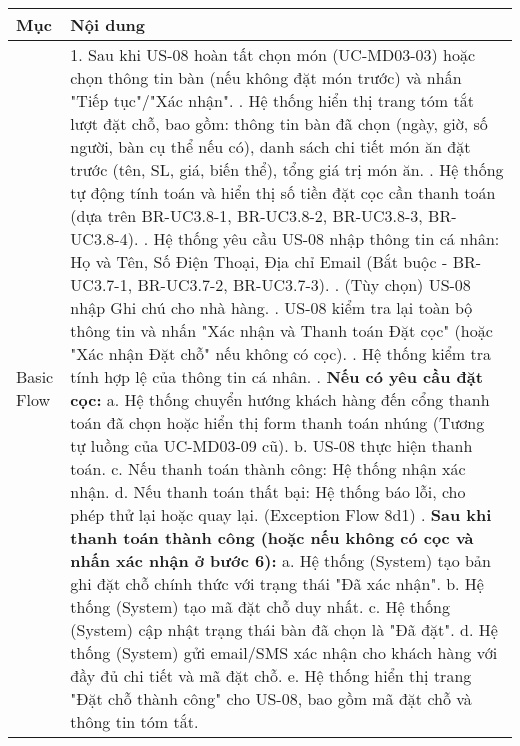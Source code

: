 \begin{longtable}{|m{4cm}|p{11cm}|}
\hline
\textbf{Mục} & \textbf{Nội dung} \\
\hline
Basic Flow & 1. Sau khi US-08 hoàn tất chọn món (UC-MD03-03) hoặc chọn thông tin bàn (nếu không đặt món trước) và nhấn "Tiếp tục"/"Xác nhận". \newline 2. Hệ thống hiển thị trang tóm tắt lượt đặt chỗ, bao gồm: thông tin bàn đã chọn (ngày, giờ, số người, bàn cụ thể nếu có), danh sách chi tiết món ăn đặt trước (tên, SL, giá, biến thể), tổng giá trị món ăn. \newline 3. Hệ thống tự động tính toán và hiển thị số tiền đặt cọc cần thanh toán (dựa trên BR-UC3.8-1, BR-UC3.8-2, BR-UC3.8-3, BR-UC3.8-4). \newline 4. Hệ thống yêu cầu US-08 nhập thông tin cá nhân: Họ và Tên, Số Điện Thoại, Địa chỉ Email (Bắt buộc - BR-UC3.7-1, BR-UC3.7-2, BR-UC3.7-3). \newline 5. (Tùy chọn) US-08 nhập Ghi chú cho nhà hàng. \newline 6. US-08 kiểm tra lại toàn bộ thông tin và nhấn "Xác nhận và Thanh toán Đặt cọc" (hoặc "Xác nhận Đặt chỗ" nếu không có cọc). \newline 7. Hệ thống kiểm tra tính hợp lệ của thông tin cá nhân. \newline 8. \textbf{Nếu có yêu cầu đặt cọc:} \newline    a. Hệ thống chuyển hướng khách hàng đến cổng thanh toán đã chọn hoặc hiển thị form thanh toán nhúng (Tương tự luồng của UC-MD03-09 cũ). \newline    b. US-08 thực hiện thanh toán. \newline    c. Nếu thanh toán thành công: Hệ thống nhận xác nhận. \newline    d. Nếu thanh toán thất bại: Hệ thống báo lỗi, cho phép thử lại hoặc quay lại. (Exception Flow 8d1) \newline 9. \textbf{Sau khi thanh toán thành công (hoặc nếu không có cọc và nhấn xác nhận ở bước 6):} \newline    a. Hệ thống (System) tạo bản ghi đặt chỗ chính thức với trạng thái "Đã xác nhận". \newline    b. Hệ thống (System) tạo mã đặt chỗ duy nhất. \newline    c. Hệ thống (System) cập nhật trạng thái bàn đã chọn là "Đã đặt". \newline    d. Hệ thống (System) gửi email/SMS xác nhận cho khách hàng với đầy đủ chi tiết và mã đặt chỗ. \newline    e. Hệ thống hiển thị trang "Đặt chỗ thành công" cho US-08, bao gồm mã đặt chỗ và thông tin tóm tắt. \\

\end{longtable}

